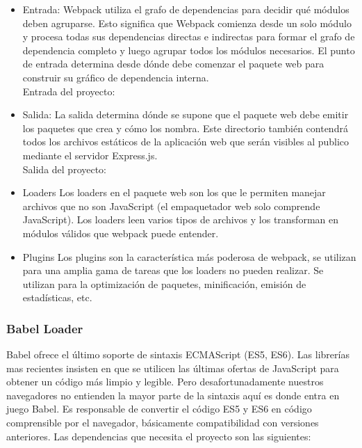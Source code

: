 \begin{itemize}
  \item Entrada:
  Webpack utiliza el grafo de dependencias para decidir qué módulos deben agruparse. Esto significa que Webpack comienza desde un solo módulo y procesa todas sus dependencias directas e indirectas para formar el grafo de dependencia completo y luego agrupar todos los módulos necesarios.
  El punto de entrada determina desde dónde debe comenzar el paquete web para construir su gráfico de dependencia interna.\\
  Entrada del proyecto: 
  \item Salida:
  La salida determina dónde se supone que el paquete web debe emitir los paquetes que crea y cómo los nombra. Este directorio también contendrá todos los archivos estáticos de la aplicación web que serán visibles al publico mediante el servidor Express.js.\\
  Salida del proyecto: 
  \item Loaders
  Los loaders en el paquete web son los que le permiten manejar archivos que no son JavaScript (el empaquetador web solo comprende JavaScript). Los loaders leen varios tipos de archivos y los transforman en módulos válidos que webpack puede entender.
  \item Plugins
  Los plugins son la característica más poderosa de webpack, se utilizan para una amplia gama de tareas que los loaders no pueden realizar. Se utilizan  para la optimización de paquetes, minificación, emisión de estadísticas, etc.
\end{itemize}
\vspace{0.8cm}

\subsubsection{Babel Loader}
Babel ofrece el último soporte de sintaxis ECMAScript (ES5, ES6). Las librerías mas recientes insisten en que se utilicen las últimas ofertas de JavaScript para obtener un código más limpio y legible. Pero desafortunadamente nuestros navegadores no entienden la mayor parte de la sintaxis aquí es donde entra en juego Babel. Es responsable de convertir el código ES5 y ES6 en código comprensible por el navegador, básicamente compatibilidad con versiones anteriores. Las dependencias que necesita el proyecto son las siguientes:
\vspace{0.8cm}

